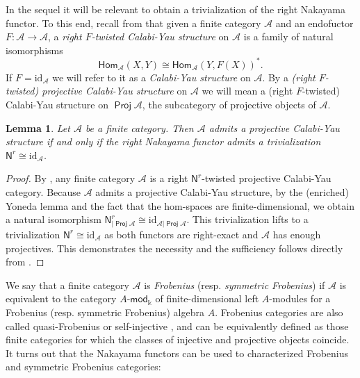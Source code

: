 \documentclass[11pt]{article}
\newtheorem{lemma}[theorem]{Lemma}
\theoremstyle{definition}
\begin{document}
In the sequel it will be relevant to obtain a trivialization of the right Nakayama functor. To this end, recall from \cite{tracesw} that given a finite category $\mathcal{A}$ and an endofuctor $F: \mathcal{A} \longrightarrow \mathcal{A}$, a \emph{right $F$-twisted Calabi-Yau structure} on $\mathcal{A}$ is a family of natural isomorphisms $$ \mathsf{Hom}_{\mathcal{A}}(X,Y) \cong \mathsf{Hom}_\mathcal{A} (Y, F(X))^*.  $$
If $F= \mathrm{id}_\mathcal{A}$ we will refer to it as a \emph{Calabi-Yau structure} on $\mathcal{A}$. By a \emph{(right $F$-twisted) projective Calabi-Yau structure} on $\mathcal{A}$ we will mean a  (right $F$-twisted) Calabi-Yau structure on $\operatorname{\mathsf{Proj}} \mathcal{A}$, the subcategory of projective objects of $\mathcal{A}$.





\begin{lemma}\label{lem:trivializ_on_ProjA}
Let $\mathcal{A}$ be a finite category. Then $\mathcal{A}$ admits a projective Calabi-Yau structure if and only if the right Nakayama functor admits a trivialization $\mathsf{N}^r \cong \mathrm{id}_\mathcal{A}$.
\end{lemma}
\begin{proof}
By \cite[Corollary 2.3]{tracesw}, any finite category $\mathcal{A}$ is a right $\mathsf{N}^r$-twisted projective Calabi-Yau category. Because $\mathcal{A}$ admits a projective Calabi-Yau structure, by the (enriched) Yoneda lemma and the fact that the hom-spaces are finite-dimensional, we obtain a natural isomorphism $\mathsf{N}^r_{|\operatorname{\mathsf{Proj}} \mathcal{A}} \cong \mathrm{id}_{\mathcal{A}| \operatorname{\mathsf{Proj}} \mathcal{A}}$. This trivialization lifts to a trivialization $\mathsf{N}^r \cong \mathrm{id}_\mathcal{A}$ as both functors are right-exact and  $\mathcal{A}$ has enough projectives. This demonstrates the necessity and the sufficiency follows directly from \cite[Corollary 2.3]{tracesw}.
\end{proof}



We say that a finite category $\mathcal{A}$ is \emph{Frobenius} (resp. \emph{symmetric Frobenius}) if $\mathcal{A}$ is equivalent to the category $A\text{-}\mathsf{mod}_\Bbbk$ of finite-dimensional left $A$-modules for a Frobenius (resp. symmetric Frobenius) algebra $A$. Frobenius categories are also called quasi-Frobenius \cite{egno} or self-injective \cite{fss}, and can be equivalently defined as those finite categories for which the classes of injective and projective objects coincide. It turns out that the Nakayama functors can be used to characterized Frobenius and symmetric Frobenius categories:
\end{document}
